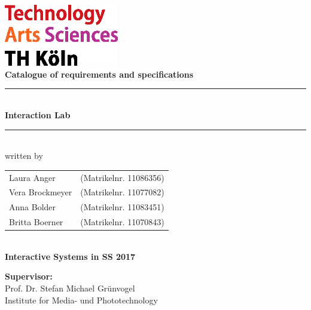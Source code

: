 \thispagestyle{empty}
\begin{center}
			\includegraphics[width=5cm]{Bilder/logo_TH}\\[12ex]
			{\Huge\textbf{Catalogue of requirements and specifications}}\\[8ex]
			\rule{.8\textwidth}{.2pt}
			{\Large\\[1ex] \textbf{Interaction Lab}}\\
			\rule{.8\textwidth}{.2pt}\\[10ex]
			written by\\[2ex]
			\begin{tabular}{ll}
			Laura Anger &(Matrikelnr. 11086356)\\ 
			Vera Brockmeyer &(Matrikelnr. 11077082)\\
			Anna Bolder &(Matrikelnr. 11083451)\\
			Britta Boerner &(Matrikelnr. 11070843)\\
			\end{tabular}\\[10ex]
			\textbf{Interactive Systems in SS 2017}\\			
			\end{center}
			\vfill
			\begin{flushleft}
			{\bf Supervisor:}\\
			Prof. Dr. Stefan Michael Grünvogel\\
			Institute for Media- und Phototechnology
			\end{flushleft}
	\newpage